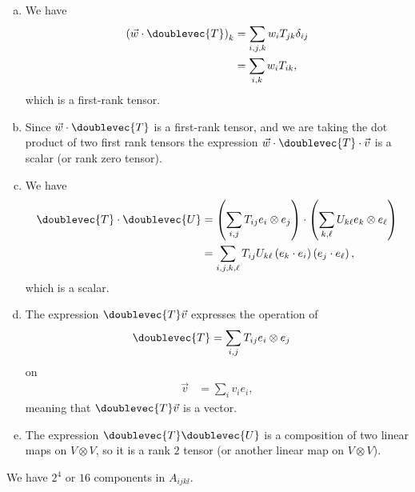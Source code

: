 \documentclass[10pt]{mypackage}
\begin{document}
\RaggedRight
\begin{solution}[29.5]\hfill
  \begin{enumerate}[(a)]
    \item We have
      \begin{align*}
        \left( \vec{w}\cdot \doublevec{T} \right)_{k} &= \sum_{i,j,k}w_{i}T_{jk}\delta_{ij}\\
                                   &= \sum_{i,k}w_iT_{ik},
      \end{align*}
      which is a first-rank tensor.
    \item Since $\vec{w}\cdot \doublevec{T}$ is a first-rank tensor, and we are taking the dot product of two first rank tensors the expression $\vec{w}\cdot \doublevec{T}\cdot \vec{v}$ is a scalar (or rank zero tensor).
    \item We have
      \begin{align*}
        \doublevec{T}\cdot \doublevec{U} &= \left( \sum_{i,j}T_{ij}e_i\otimes e_j \right)\cdot \left( \sum_{k,\ell}U_{k\ell} e_{k}\otimes e_{\ell} \right)\\
                                         &= \sum_{i,j,k,\ell}T_{ij}U_{k \ell} \left( e_k\cdot e_i \right)\left( e_j\cdot e_{\ell} \right),
      \end{align*}
      which is a scalar.
    \item The expression $\doublevec{T}\vec{v}$ expresses the operation of
      \begin{align*}
        \doublevec{T} &= \sum_{i,j}T_{ij}e_i\otimes e_j
      \end{align*}
      on
      \begin{align*}
        \vec{v} &= \sum_{i}v_ie_i,
      \end{align*}
      meaning that $\doublevec{T}\vec{v}$ is a vector.
    \item The expression $\doublevec{T}\doublevec{U}$ is a composition of two linear maps on $V\otimes V$, so it is a rank $2$ tensor (or another linear map on $V\otimes V$).
  \end{enumerate}
\end{solution}
\begin{solution}[29.7]
  We have $2^{4}$ or $16$ components in $A_{ijkl}$.
\end{solution}
\begin{solution}[29.10]

\end{solution}
\begin{solution}[29.11]\hfill
\end{solution}
\end{document}
